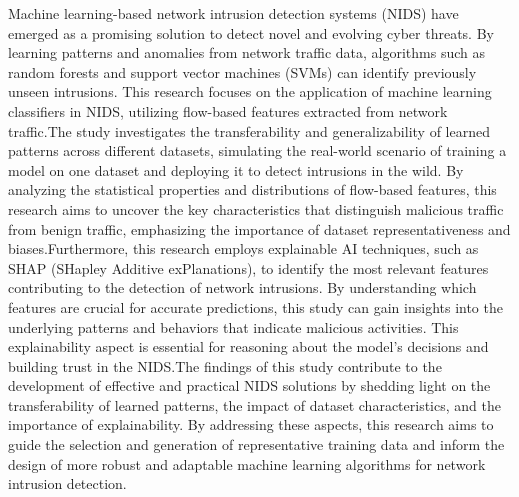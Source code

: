 Machine learning-based network intrusion detection systems (NIDS) have emerged as a promising solution to detect novel and evolving cyber threats. By learning patterns and anomalies from network traffic data, algorithms such as random forests and support vector machines (SVMs) can identify previously unseen intrusions. This research focuses on the application of machine learning classifiers in NIDS, utilizing flow-based features extracted from network traffic.\@ The study investigates the transferability and generalizability of learned patterns across different datasets, simulating the real-world scenario of training a model on one dataset and deploying it to detect intrusions in the wild. By analyzing the statistical properties and distributions of flow-based features, this research aims to uncover the key characteristics that distinguish malicious traffic from benign traffic, emphasizing the importance of dataset representativeness and biases.\@ Furthermore, this research employs explainable AI techniques, such as SHAP (SHapley Additive exPlanations), to identify the most relevant features contributing to the detection of network intrusions. By understanding which features are crucial for accurate predictions, this study can gain insights into the underlying patterns and behaviors that indicate malicious activities. This explainability aspect is essential for reasoning about the model's decisions and building trust in the NIDS.\@ The findings of this study contribute to the development of effective and practical NIDS solutions by shedding light on the transferability of learned patterns, the impact of dataset characteristics, and the importance of explainability. By addressing these aspects, this research aims to guide the selection and generation of representative training data and inform the design of more robust and adaptable machine learning algorithms for network intrusion detection.